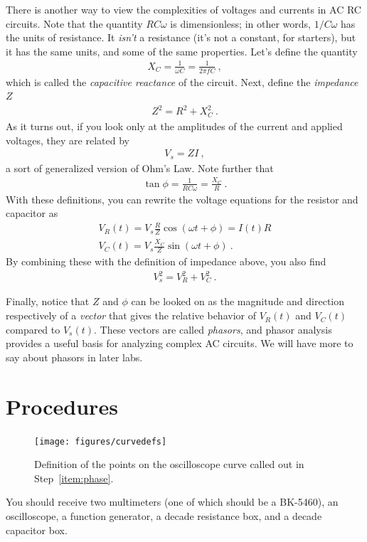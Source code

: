 \documentclass[12pt]{article}
\begin{document}
There is another way to view the complexities of voltages and currents
in AC RC circuits.  Note that the quantity $RC\omega$ is
dimensionless; in other words, $1/C\omega$ has the units of
resistance.  It \textit{isn't} a resistance (it's not a constant, for
starters), but it has the same units, and some of the same properties.
Let's define the quantity
\begin{gather*}
  X_C = \frac{1}{\omega C} = \frac{1}{2\pi f C}\ ,
\end{gather*}
which is called the \textit{capacitive reactance} of the circuit.
Next, define the \textit{impedance} $Z$
\begin{gather*}
  Z^2 = R^2 + X_C^2\ .
\end{gather*}
As it turns out, if you look only at the amplitudes of the current and
applied voltages, they are related by
\begin{gather*}
  V_s = Z I\ ,
\end{gather*}
a sort of generalized version of Ohm's Law.  Note further that
\begin{gather*}
  \tan \phi = \frac{1}{RC\omega} = \frac{X_C}{R}\ .
\end{gather*}
With these definitions, you can rewrite the voltage equations for the
resistor and capacitor as
\begin{gather*}
  V_R(t) = V_s \frac{R}{Z} \cos( \omega t + \phi) = I(t) R\\
  V_C(t) = V_s \frac{X_C}{Z} \sin( \omega t + \phi)\ .
\end{gather*}
By combining these with the definition of impedance above, you also
find
\begin{gather*}
  V_s^2 = V_R^2 + V_C^2\ .
\end{gather*}

Finally, notice that $Z$ and $\phi$ can be looked on as the magnitude
and direction respectively of a \textit{vector} that gives the
relative behavior of $V_R(t)$ and $V_C(t)$ compared to $V_s(t)$.
These vectors are called \textit{phasors}, and phasor analysis
provides a useful basis for analyzing complex AC circuits.  We will
have more to say about phasors in later labs.

\section{Procedures}
\label{sec:procedures}

\begin{figure}
  \centering
 \texttt{[image: figures/curvedefs]} 
  \caption{Definition of the points on the oscilloscope curve called
    out in Step~\ref{item:phase}.} 
  \label{fig:curvedefs}
\end{figure}
You should receive two multimeters (one of which should be a
BK-5460), an oscilloscope, a function generator, a
decade resistance box, and a decade capacitor box.
\end{document}
